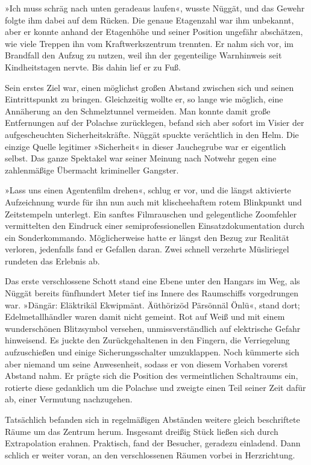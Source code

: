 »Ich muss schräg nach unten geradeaus laufen«, wusste Nüggät, und das Gewehr folgte ihm dabei auf dem Rücken. Die genaue Etagenzahl war ihm unbekannt, aber er konnte anhand der Etagenhöhe und seiner Position ungefähr abschätzen, wie viele Treppen ihn vom Kraftwerkszentrum trennten. Er nahm sich vor, im Brandfall den Aufzug zu nutzen, weil ihn der gegenteilige Warnhinweis seit Kindheitstagen nervte. Bis dahin lief er zu Fuß.

Sein erstes Ziel war, einen möglichst großen Abstand zwischen sich und seinen Eintrittspunkt zu bringen. Gleichzeitig wollte er, so lange wie möglich, eine Annäherung an den Schmelztunnel vermeiden. Man konnte damit große Entfernungen auf der Polachse zurücklegen, befand sich aber sofort im Visier der aufgescheuchten Sicherheitskräfte. Nüggät spuckte verächtlich in den Helm. Die einzige Quelle legitimer »Sicherheit« in dieser Jauchegrube war er eigentlich selbst. Das ganze Spektakel war seiner Meinung nach Notwehr gegen eine zahlenmäßige Übermacht krimineller Gangster.

»Lass uns einen Agentenfilm drehen«, schlug er vor, und die längst aktivierte Aufzeichnung wurde für ihn nun auch mit klischeehaftem rotem Blinkpunkt und Zeitstempeln unterlegt. Ein sanftes Filmrauschen und gelegentliche Zoomfehler vermittelten den Eindruck einer semiprofessionellen Einsatzdokumentation durch ein Sonderkommando. Möglicherweise hatte er längst den Bezug zur Realität verloren, jedenfalls fand er Gefallen daran. Zwei schnell verzehrte Müsliriegel rundeten das Erlebnis ab.

Das erste verschlossene Schott stand eine Ebene unter den Hangars im Weg, als Nüggät bereits fünfhundert Meter tief ins Innere des Raumschiffs vorgedrungen war. »Dängär: Eläktrikäl Ekwipmänt. Äüthörizöd Pärsönnäl Önlü«, stand dort; Edelmetallhändler waren damit nicht gemeint. Rot auf Weiß und mit einem wunderschönen Blitzsymbol versehen, unmissverständlich auf elektrische Gefahr hinweisend. Es juckte den Zurückgehaltenen in den Fingern, die Verriegelung aufzuschießen und einige Sicherungsschalter umzuklappen. Noch kümmerte sich aber niemand um seine Anwesenheit, sodass er von diesem Vorhaben vorerst Abstand nahm. Er prägte sich die Position des vermeintlichen Schaltraums ein, rotierte diese gedanklich um die Polachse und zweigte einen Teil seiner Zeit dafür ab, einer Vermutung nachzugehen.

Tatsächlich befanden sich in regelmäßigen Abständen weitere gleich beschriftete Räume um das Zentrum herum. Insgesamt dreißig Stück ließen sich durch Extrapolation erahnen. Praktisch, fand der Besucher, geradezu einladend. Dann schlich er weiter voran, an den verschlossenen Räumen vorbei in Herzrichtung.

